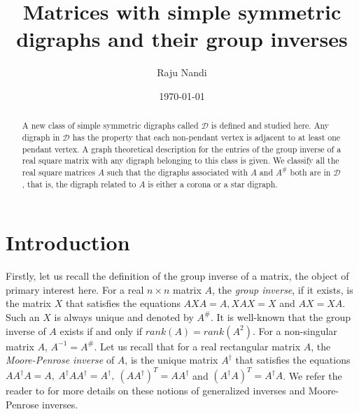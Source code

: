 \documentclass[notitlepage,12pt,reqno]{amsart}
\numberwithin{equation}{section}
\begin{document}
	
	\title[Matrices with simple symmetric digraphs and their group inverses]{Matrices with simple symmetric digraphs and their group inverses}

	
	\author{Raju Nandi}
	\address[R.~Nandi]{Department of Sciences, Indian Institute of Information Technology Design and Manufacturing, Kurnool, Andhra Pradesh 518008, India}
	
	\date{\today}
	
	\begin{abstract}
		A new class of simple symmetric digraphs called $\mathcal{D}$ is defined and studied here. Any digraph in $\mathcal{D}$ has the property that each non-pendant vertex is adjacent to at least one pendant vertex. A graph theoretical description for the entries of the group inverse of a real square matrix with any digraph belonging to this class is given. We classify all the real square matrices $A$ such that the digraphs associated with $A$ and $A^{\#}$ both are in $\mathcal{D}$, that is, the digraph related to $A$ is either a corona or a star digraph.
	\end{abstract}
	
	

 \maketitle
\section{Introduction}
Firstly, let us recall the definition of the group inverse of a matrix, the object of primary interest here. For a real $n\times n$ matrix $A$, the {\it group inverse}, if it exists, is the matrix $X$ that satisfies the equations $AXA=A, XAX=X$ and $AX=XA$. Such an $X$ is always unique and denoted by $A^{\#}$. It is well-known that the group inverse of $A$ exists if and only if $rank(A)=rank(A^2)$. For a non-singular matrix $A$, $A^{-1}=A^{\#}$. Let us recall that for a real rectangular matrix $A$, the {\it Moore-Penrose inverse} of $A$, is the unique matrix $A^{\dagger}$ that satisfies the equations $AA^{\dagger}A=A,~A^{\dagger}AA^{\dagger}=A^{\dagger},~(AA^{\dagger})^T=AA^{\dagger}$ and $(A^{\dagger}A)^T=A^{\dagger}A$. We refer the reader to \cite{bg} for more details on these notions of generalized inverses and Moore-Penrose inverses.
\end{document}

